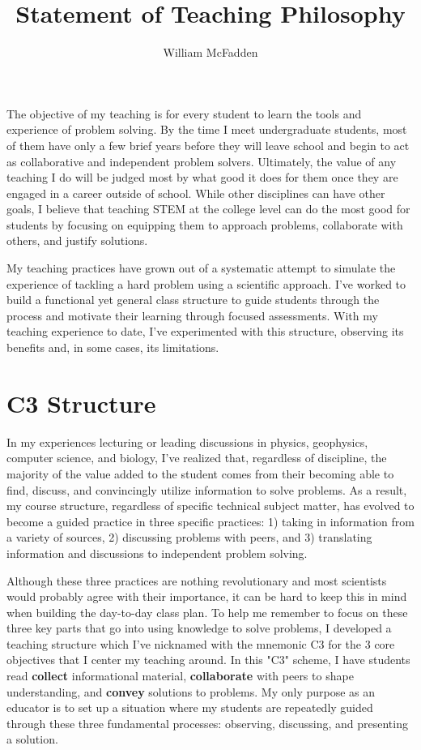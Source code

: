 \documentclass[12pt]{amsart} \usepackage{amssymb}
\title[]{Statement of Teaching Philosophy}
\author[]{William McFadden}
\begin{document}
\maketitle
\thispagestyle{empty}

The objective of my teaching is for every student to learn the tools and experience of problem solving.  By the time I meet undergraduate students, most of them have only a few brief years before they will leave school and begin to act as collaborative and independent problem solvers. Ultimately, the value of any teaching I do will be judged most by what good it does for them once they are engaged in a career outside of school. While other disciplines can have other goals, I believe that teaching STEM at the college level can do the most good for students by focusing on equipping them to approach problems, collaborate with others, and justify solutions. 

My teaching practices have grown out of a systematic attempt to simulate the experience of tackling a hard problem using a scientific approach. I've worked to build a functional yet general class structure to guide students through the process and motivate their learning through focused assessments.  With my teaching experience to date, I've experimented with this structure, observing its benefits and, in some cases, its limitations.

\section*{C3 Structure}
In my experiences lecturing or leading discussions in physics, geophysics, computer science, and biology, I've realized that, regardless of discipline, the majority of the value added to the student comes from their becoming able to find, discuss, and convincingly utilize information to solve problems. As a result, my course structure, regardless of specific technical subject matter, has evolved to become a guided practice in three specific practices: 1) taking in information from a variety of sources, 2) discussing problems with peers, and 3) translating information and discussions to independent problem solving.

Although these three practices are nothing revolutionary and most scientists would probably agree with their importance, it can be hard to keep this in mind when building the day-to-day class plan.  To help me remember to focus on these three key parts that go into using knowledge to solve problems, I developed a teaching structure which I've nicknamed with the mnemonic C3 for the 3 core objectives that I center my teaching around. In this "C3" scheme, I have students read \textbf{collect} informational material, \textbf{collaborate} with peers to shape understanding, and \textbf{convey} solutions to problems. My only purpose as an educator is to set up a situation where my students are repeatedly guided through these three fundamental processes: observing, discussing, and presenting a solution.
\end{document}
